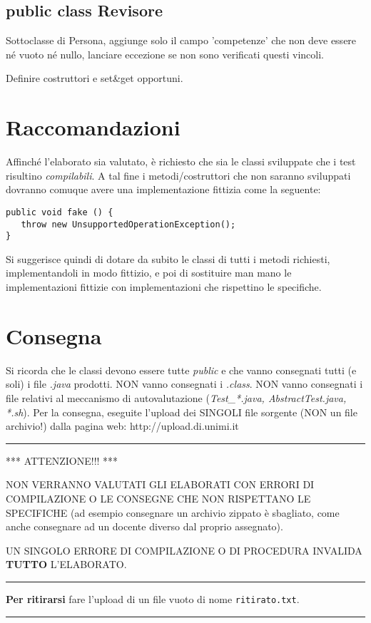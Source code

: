 \documentclass[a4paper]{article}
\begin{document}
\subsection*{public class Revisore}

Sottoclasse di Persona, aggiunge solo il campo 'competenze' che non deve essere 
né vuoto né nullo, lanciare eccezione se non sono verificati questi vincoli.

Definire costruttori e set\&get opportuni.



\section*{Raccomandazioni}

Affinché l'elaborato sia valutato, è richiesto che sia le classi sviluppate che i test risultino
\textit{compilabili}. A tal fine i metodi/costruttori che non saranno sviluppati dovranno comuque avere
una implementazione fittizia come la seguente:
\begin{verbatim}
public void fake () {
   throw new UnsupportedOperationException();
}
\end{verbatim}
Si suggerisce quindi di dotare da subito le classi di tutti i metodi richiesti, 
implementandoli in modo fittizio, e poi di sostituire man mano le 
implementazioni fittizie con implementazioni che rispettino le specifiche.
 
\section*{Consegna}


Si ricorda che le classi devono essere tutte \textit{public} e che vanno 
consegnati tutti (e soli) i file \textit{.java} prodotti.
NON vanno consegnati i \textit{.class}.
NON vanno consegnati i file relativi al meccanismo di autovalutazione 
(\textit{Test\_*.java, AbstractTest.java, *.sh}).
Per la consegna, eseguite l'upload dei SINGOLI file sorgente (NON un file archivio!) dalla pagina web: http://upload.di.unimi.it

\hrule
\medskip
\begin{center}*** ATTENZIONE!!! ***\end{center}

NON VERRANNO VALUTATI GLI ELABORATI CON ERRORI DI COMPILAZIONE O 
LE CONSEGNE CHE NON RISPETTANO LE SPECIFICHE (ad esempio consegnare un 
archivio zippato è sbagliato, come anche consegnare ad un docente diverso dal 
proprio assegnato).

UN SINGOLO ERRORE DI COMPILAZIONE O DI PROCEDURA INVALIDA 
\textbf{TUTTO} 
L'ELABORATO.

\medskip


\hrule
\medskip
{\bf Per ritirarsi}
fare l'upload di un file vuoto di nome  \texttt{ritirato.txt}.

\hrule


\end{document}
